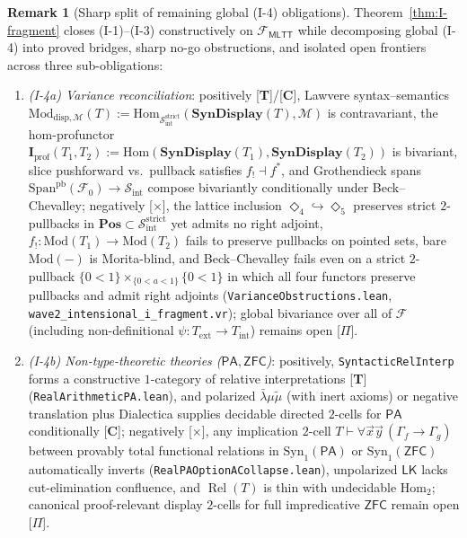 \documentclass[11pt]{article}
\theoremstyle{plain}
\theoremstyle{definition}
\newtheorem{remark}[theorem]{Remark}
\newcommand{\cS}{\mathcal{S}}
\newcommand{\cF}{\mathcal{F}}
\newcommand{\Sint}{\cS_{\mathrm{int}}}
\newcommand{\Hom}{\mathrm{Hom}}
\newcommand{\Syn}{\mathrm{Syn}}
\newcommand{\Mod}{\mathrm{Mod}}
\newcommand{\PA}{\mathsf{PA}}
\newcommand{\ZFC}{\mathsf{ZFC}}
\newcommand{\MLTT}{\mathsf{MLTT}}
\begin{document}
\begin{remark}[Sharp split of remaining global (I-4) obligations]\label{rem:I4-isolation}
Theorem~\ref{thm:I-fragment} closes (I-1)--(I-3) constructively on $\mathcal{F}_{\MLTT}$ while decomposing global (I-4) into proved bridges, sharp no-go obstructions, and isolated open frontiers across three sub-obligations:
\begin{enumerate}[nosep,label=\textup{(\alph*)}]
\item \emph{\textup{(I-4a)} Variance reconciliation}: positively \textup{[\textbf{T}]/[\textbf{C}]}, Lawvere syntax--semantics $\Mod_{\mathrm{disp},\mathcal{M}}(T) := \Hom_{\mathcal{S}_{\mathrm{int}}^{\mathrm{strict}}}(\mathbf{SynDisplay}(T), \mathcal{M})$ is contravariant, the hom-profunctor $\mathbf{I}_{\mathrm{prof}}(T_1, T_2) := \Hom(\mathbf{SynDisplay}(T_1), \mathbf{SynDisplay}(T_2))$ is bivariant, slice pushforward vs.\ pullback satisfies $f_! \dashv f^*$, and Grothendieck spans $\mathrm{Span}^{\mathrm{pb}}(\cF_0) \to \Sint$ compose bivariantly conditionally under Beck--Chevalley; negatively \textup{[\textbf{$\times$}]}, the lattice inclusion $\Diamond_4 \hookrightarrow \Diamond_5$ preserves strict $2$-pullbacks in $\mathbf{Pos} \subset \mathcal{S}_{\mathrm{int}}^{\mathrm{strict}}$ yet admits no right adjoint, $f_! : \Mod(T_1) \to \Mod(T_2)$ fails to preserve pullbacks on pointed sets, bare $\Mod(-)$ is Morita-blind, and Beck--Chevalley fails even on a strict $2$-pullback $\{0<1\} \times_{\{0<a<1\}} \{0<1\}$ in which all four functors preserve pullbacks and admit right adjoints (\texttt{VarianceObstructions.lean}, \texttt{wave2\_intensional\_i\_fragment.vr}); global bivariance over all of $\cF$ (including non-definitional $\psi : T_{\mathrm{ext}} \to T_{\mathrm{int}}$) remains open \textup{[\textbf{$\Pi$}]}.
\item \emph{\textup{(I-4b)} Non-type-theoretic theories ($\PA, \ZFC$)}: positively, \texttt{SyntacticRelInterp} forms a constructive $1$-category of relative interpretations \textup{[\textbf{T}]} (\texttt{RealArithmeticPA.lean}), and polarized $\bar{\lambda}\mu\tilde{\mu}$ (with inert axioms) or negative translation plus Dialectica supplies decidable directed $2$-cells for $\PA$ conditionally \textup{[\textbf{C}]}; negatively \textup{[\textbf{$\times$}]}, any implication $2$-cell $T \vdash \forall \vec{x}\vec{y}\,(\Gamma_f \to \Gamma_g)$ between provably total functional relations in $\Syn_1(\PA)$ or $\Syn_1(\ZFC)$ automatically inverts (\texttt{RealPAOptionACollapse.lean}), unpolarized $\mathsf{LK}$ lacks cut-elimination confluence, and $\operatorname{Rel}(T)$ is thin with undecidable $\Hom_2$; canonical proof-relevant display $2$-cells for full impredicative $\ZFC$ remain open \textup{[\textbf{$\Pi$}]}.

\end{enumerate}
\end{remark}
\end{document}
